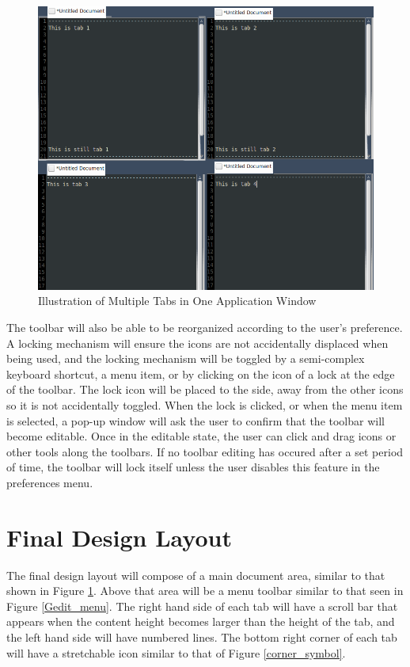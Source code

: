 \documentclass[11pt, oneside]{article}
\begin{document}
\begin{figure}
    \centering
    \includegraphics[width=.8\textwidth]{photos/multitasking_tabs.png}
    \caption{Illustration of Multiple Tabs in One Application Window}
    \label{multitasking_tabs}
\end{figure}

The toolbar will also be able to be reorganized according to the user's preference. A locking mechanism will ensure the icons are not accidentally displaced when being used, and the locking mechanism will be toggled by a semi-complex keyboard shortcut, a menu item, or by clicking on the icon of a lock at the edge of the toolbar. The lock icon will be placed to the side, away from the other icons so it is not accidentally toggled. When the lock is clicked, or when the menu item is selected, a pop-up window will ask the user to confirm that the toolbar will become editable. Once in the editable state, the user can click and drag icons or other tools along the toolbars. If no toolbar editing has occured after a set period of time, the toolbar will lock itself unless the user disables this feature in the preferences menu. 

\section{Final Design Layout}
The final design layout will compose of a main document area, similar to that shown in Figure \ref{multitasking_tabs}. Above that area will be a menu toolbar similar to that seen in Figure \ref{Gedit_menu}. The right hand side of each tab will have a scroll bar that appears when the content height becomes larger than the height of the tab, and the left hand side will have numbered lines. The bottom right corner of each tab will have a stretchable icon similar to that of Figure \ref{corner_symbol}. 
\end{document}
